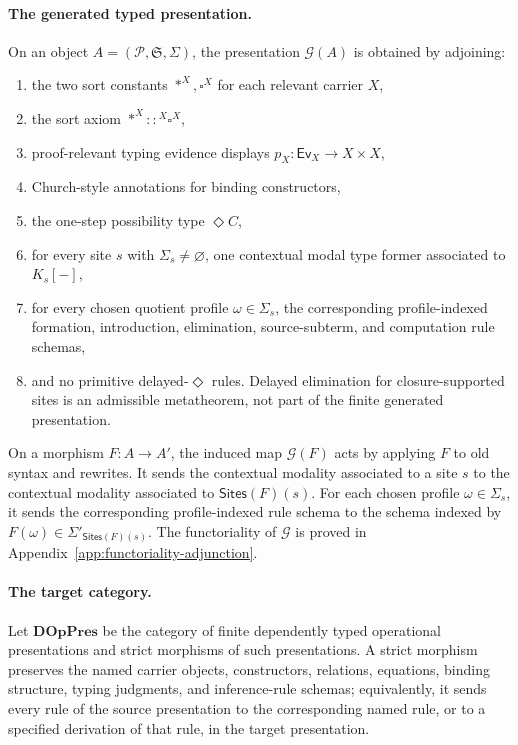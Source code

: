 \documentclass[11pt]{article}
\newcommand{\ty}{\mathrel{::}}
\newcommand{\Dia}{\Diamond}
\newcommand{\Sites}{\mathsf{Sites}}
\newcommand{\Sig}{\Sigma}
\newcommand{\Ev}{\mathsf{Ev}}
\begin{document}
\paragraph{The generated typed presentation.}
On an object \(A=(\mathcal{P},\mathfrak{S},\Sig)\), the presentation
\(\mathcal{G}(A)\) is obtained by adjoining:
\begin{enumerate}[label=\textup{(\roman*)}]
  \item the two sort constants \(\ast^X,\square^X\) for each relevant carrier
  \(X\),
  \item the sort axiom \(\ast^X\ty^X\square^X\),
  \item proof-relevant typing evidence displays \(p_X:\Ev_X\to X\times X\),
  \item Church-style annotations for binding constructors,
  \item the one-step possibility type \(\Dia C\),
  \item for every site \(s\) with \(\Sig_s\neq\varnothing\), one contextual
modal type former associated to \(K_s[-]\),
  \item for every chosen quotient profile \(\omega\in\Sig_s\), the
corresponding profile-indexed formation, introduction, elimination,
source-subterm, and computation rule schemas,
  \item and no primitive delayed-\(\Dia\) rules.  Delayed elimination for closure-supported sites is an admissible metatheorem, not part of the finite generated presentation.
\end{enumerate}
On a morphism \(F:A\to A'\), the induced map \(\mathcal{G}(F)\) acts by
applying \(F\) to old syntax and rewrites.  It sends the contextual modality
associated to a site \(s\) to the contextual modality associated to
\(\Sites(F)(s)\).  For each chosen profile \(\omega\in\Sig_s\), it sends the
corresponding profile-indexed rule schema to the schema indexed by
\(F(\omega)\in\Sig'_{\Sites(F)(s)}\).  The functoriality of
\(\mathcal{G}\) is proved in Appendix~\ref{app:functoriality-adjunction}.

\paragraph{The target category.}
Let \(\mathbf{DOpPres}\) be the category of finite dependently typed
operational presentations and strict morphisms of such presentations.  A strict
morphism preserves the named carrier objects, constructors, relations,
equations, binding structure, typing judgments, and inference-rule schemas;
equivalently, it sends every rule of the source presentation to the
corresponding named rule, or to a specified derivation of that rule, in the
target presentation.
\end{document}
